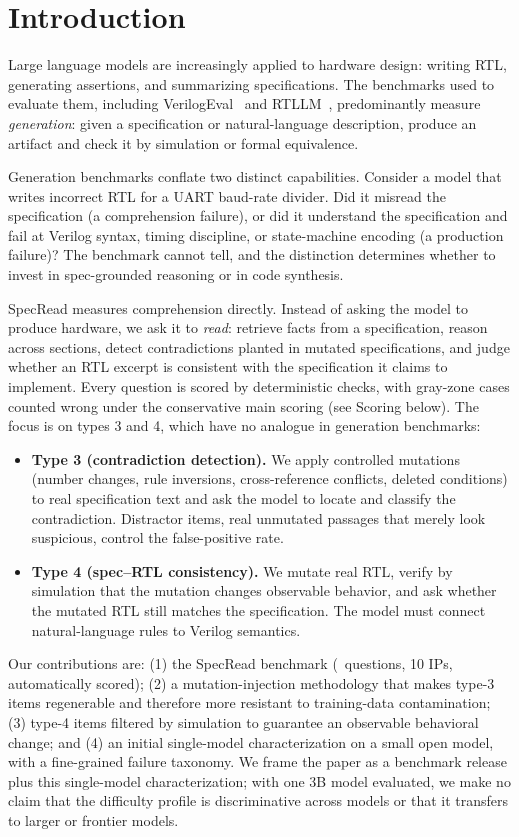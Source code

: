 \documentclass[11pt]{article}
\begin{document}
\section{Introduction}
Large language models are increasingly applied to hardware design: writing RTL, generating assertions, and summarizing specifications. The benchmarks used to evaluate them, including VerilogEval~\cite{verilogeval} and RTLLM~\cite{rtllm}, predominantly measure \emph{generation}: given a specification or natural-language description, produce an artifact and check it by simulation or formal equivalence.

Generation benchmarks conflate two distinct capabilities. Consider a model that writes incorrect RTL for a UART baud-rate divider. Did it misread the specification (a comprehension failure), or did it understand the specification and fail at Verilog syntax, timing discipline, or state-machine encoding (a production failure)? The benchmark cannot tell, and the distinction determines whether to invest in spec-grounded reasoning or in code synthesis.

SpecRead measures comprehension directly. Instead of asking the model to produce hardware, we ask it to \emph{read}: retrieve facts from a specification, reason across sections, detect contradictions planted in mutated specifications, and judge whether an RTL excerpt is consistent with the specification it claims to implement. Every question is scored by deterministic checks, with gray-zone cases counted wrong under the conservative main scoring (see Scoring below). The focus is on types 3 and 4, which have no analogue in generation benchmarks:
\begin{itemize}
\item \textbf{Type 3 (contradiction detection).} We apply controlled mutations (number changes, rule inversions, cross-reference conflicts, deleted conditions) to real specification text and ask the model to locate and classify the contradiction. Distractor items, real unmutated passages that merely look suspicious, control the false-positive rate.
\item \textbf{Type 4 (spec--RTL consistency).} We mutate real RTL, verify by simulation that the mutation changes observable behavior, and ask whether the mutated RTL still matches the specification. The model must connect natural-language rules to Verilog semantics.
\end{itemize}
Our contributions are: (1) the SpecRead benchmark (\NTotal\ questions, 10 IPs, automatically scored); (2) a mutation-injection methodology that makes type-3 items regenerable and therefore more resistant to training-data contamination; (3) type-4 items filtered by simulation to guarantee an observable behavioral change; and (4) an initial single-model characterization on a small open model, with a fine-grained failure taxonomy. We frame the paper as a benchmark release plus this single-model characterization; with one 3B model evaluated, we make no claim that the difficulty profile is discriminative across models or that it transfers to larger or frontier models.
\end{document}
